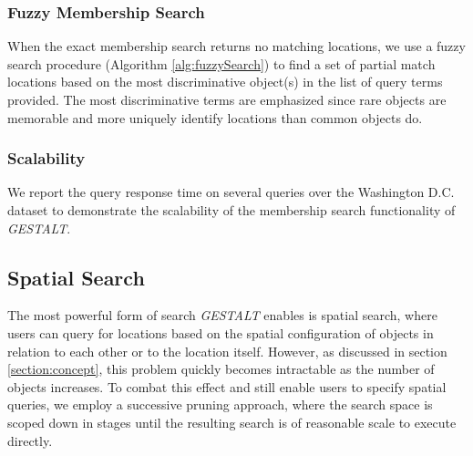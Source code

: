 \subsubsection{Fuzzy Membership Search}
When the exact membership search returns no matching locations, we use a fuzzy search procedure (Algorithm \ref{alg:fuzzySearch}) to find a set of partial match locations based on the most discriminative object(s) in the list of query terms provided. 
The most discriminative terms are emphasized since rare objects are memorable and more uniquely identify locations than common objects do.

\subsubsection{Scalability}
We report the query response time on several queries over the Washington D.C. dataset to demonstrate the scalability of the membership search functionality of \emph{GESTALT}.


        


\subsection{Spatial Search}

The most powerful form of search \emph{GESTALT} enables is spatial search, where users can query for locations based on the spatial configuration of objects in relation to each other or to the location itself.
However, as discussed in section \ref{section:concept}, this problem quickly becomes intractable as the number of objects increases.
To combat this effect and still enable users to specify spatial queries, we employ a successive pruning approach, where the search space is scoped down in stages until the resulting search is of reasonable scale to execute directly.

